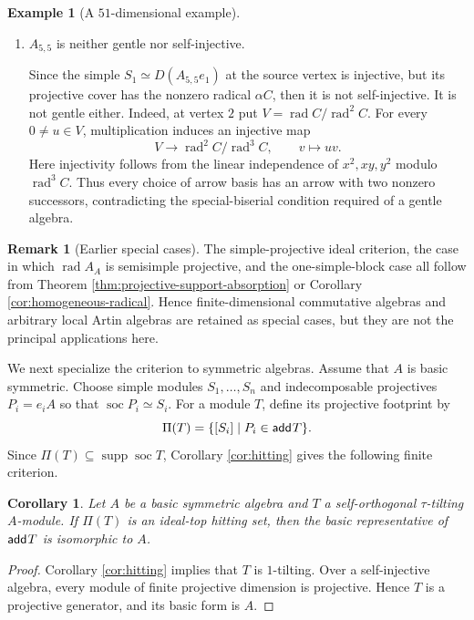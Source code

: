\documentclass[a4paper,reqno]{amsart}
\newtheorem{corollary}[theorem]{Corollary}
\theoremstyle{definition}
\newtheorem{remark}[theorem]{Remark}
\newtheorem{example}[theorem]{Example}
\newcommand{\rad}{\operatorname{rad}\nolimits}
\newcommand{\soc}{\operatorname{soc}\nolimits}
\newcommand{\supp}{\operatorname{supp}\nolimits}
\newcommand{\add}{\mathsf{add}\hspace{.01in}}
\numberwithin{equation}{section}
\begin{document}
\begin{example}[A $51$-dimensional example]
\begin{enumerate}
\item $A_{5,5}$ is neither gentle nor self-injective.

Since the simple $S_1\simeq D(A_{5,5}e_1)$ at the source
vertex is injective, but its projective cover has the nonzero
radical $\alpha C$, then it is not self-injective. It is not gentle either. Indeed, at vertex $2$ put
$V=\rad C/\rad^2C$. For every $0\neq u\in V$, multiplication induces
an injective map
\[
                  V\longrightarrow\rad^2C/\rad^3C,
                  \qquad v\longmapsto uv.
\]
Here injectivity follows from the linear independence of
$x^2,xy,y^2$ modulo $\rad^3C$. Thus every choice of arrow basis has
an arrow with two nonzero successors, contradicting the
special-biserial condition required of a gentle algebra.
\end{enumerate}
\end{example}

\begin{remark}[Earlier special cases]
\label{rem:earlier-special-cases}
The simple-projective ideal criterion, the case in which $\rad A_A$
is semisimple projective, and the one-simple-block case all follow
from Theorem \ref{thm:projective-support-absorption} or Corollary
\ref{cor:homogeneous-radical}. Hence finite-dimensional commutative
algebras and arbitrary local Artin algebras are retained as special
cases, but they are not the principal applications here.
\end{remark}

We next specialize the criterion to symmetric algebras. Assume that
$A$ is basic symmetric. Choose simple modules
$S_1,\dots,S_n$ and indecomposable projectives $P_i=e_iA$ so that
$\soc P_i\simeq S_i$. For a module $T$, define its projective
footprint by
\[
                       \Pi(T)=\{[S_i]\mid P_i\in\add T\}.
\]
Since $\Pi(T)\subseteq\supp\soc T$, Corollary \ref{cor:hitting} gives
the following finite criterion.

\begin{corollary}
\label{cor:symmetric-footprint}
Let $A$ be a basic symmetric algebra and $T$ a self-orthogonal
$\tau$-tilting $A$-module. If $\Pi(T)$ is an ideal-top hitting set,
then the basic representative of $\add T$ is isomorphic to $A$.
\end{corollary}

\begin{proof}
Corollary \ref{cor:hitting} implies that $T$ is $1$-tilting. Over a
self-injective algebra, every module of finite projective dimension
is projective. Hence $T$ is a projective generator, and its basic
form is $A$.
\end{proof}
\end{document}
